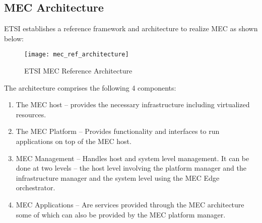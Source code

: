 \subsection{MEC Architecture}

ETSI establishes a reference framework and architecture to realize MEC as shown below:

\begin{figure}
    \centering
    \texttt{[image: mec\_ref\_architecture]}
    \label{fig:figure4}
    \caption{ETSI MEC Reference Architecture}
\end{figure}

The architecture comprises the following 4 components:
\begin{enumerate}
    \item The MEC host – provides the necessary infrastructure including virtualized resources.
    \item The MEC Platform – Provides functionality and interfaces to run applications on top of the MEC host.
    \item MEC Management – Handles host and system level management. It can be done at two levels – the host level involving the platform manager and the infrastructure manager and the system level using the MEC Edge orchestrator.
    \item MEC Applications – Are services provided through the MEC architecture some of which can also be provided by the MEC platform manager.
\end{enumerate}
